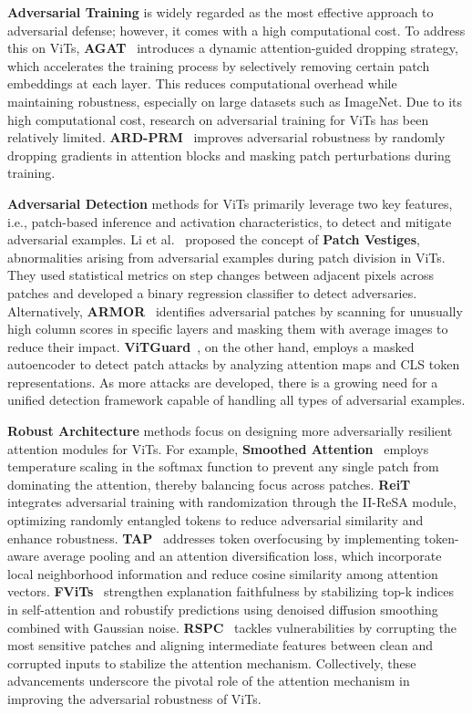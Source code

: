 \textbf{Adversarial Training} is widely regarded as the most effective approach to adversarial defense; however, it comes with a high computational cost. To address this on ViTs, \textbf{AGAT}~\cite{wu2022towards} introduces a dynamic attention-guided dropping strategy, which accelerates the training process by selectively removing certain patch embeddings at each layer. This reduces computational overhead while maintaining robustness, especially on large datasets such as ImageNet. Due to its high computational cost, research on adversarial training for ViTs has been relatively limited.
\textbf{ARD-PRM}~\cite{mo2022adversarial} improves adversarial robustness by randomly dropping gradients in attention blocks and masking patch perturbations during training.

\textbf{Adversarial Detection} methods for ViTs primarily leverage two key features, i.e., patch-based inference and activation characteristics, to detect and mitigate adversarial examples.
Li et al.~\cite{li2022patch} proposed the concept of \textbf{Patch Vestiges}, abnormalities arising from adversarial examples during patch division in ViTs. They used statistical metrics on step changes between adjacent pixels across patches and developed a binary regression classifier to detect adversaries. Alternatively, \textbf{ARMOR}~\cite{liu2023understanding} identifies adversarial patches by scanning for unusually high column scores in specific layers and masking them with average images to reduce their impact. 
\textbf{ViTGuard}~\cite{sun2024vitguard}, on the other hand, employs a masked autoencoder to detect patch attacks by analyzing attention maps and CLS token representations. As more attacks are developed, there is a growing need for a unified detection framework capable of handling all types of adversarial examples.



\textbf{Robust Architecture} methods focus on designing more adversarially resilient attention modules for ViTs. 
For example, \textbf{Smoothed Attention}~\cite{gu2022vision} employs temperature scaling in the softmax function to prevent any single patch from dominating the attention, thereby balancing focus across patches.
\textbf{ReiT}~\cite{gong2024random} integrates adversarial training with randomization through the II-ReSA module, optimizing randomly entangled tokens to reduce adversarial similarity and enhance robustness.
\textbf{TAP}~\cite{guo2023robustifying} addresses token overfocusing by implementing token-aware average pooling and an attention diversification loss, which incorporate local neighborhood information and reduce cosine similarity among attention vectors. \textbf{FViTs}~\cite{huimproving} strengthen explanation faithfulness by stabilizing top-k indices in self-attention and robustify predictions using denoised diffusion smoothing combined with Gaussian noise. \textbf{RSPC}~\cite{guo2023improving} tackles vulnerabilities by corrupting the most sensitive patches and aligning intermediate features between clean and corrupted inputs to stabilize the attention mechanism. Collectively, these advancements underscore the pivotal role of the attention mechanism in improving the adversarial robustness of ViTs.



